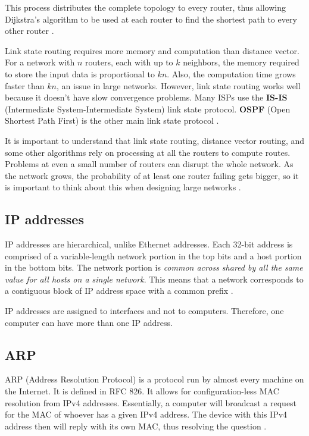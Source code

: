 \documentclass[12pt, oneside]{book}
\begin{document}
This process distributes the complete topology to every router, thus allowing Dijkstra's algorithm to be used at each router to find the shortest path to every other router \cite[p.~374]{computer-networks-tanenbaum-2012}.

Link state routing requires more memory and computation than distance vector.
For a network with \(n\) routers, each with up to \(k\) neighbors, the memory required to store the input data is proportional to \(kn\). Also, the computation time grows faster than \(kn\), an issue in large networks.
However, link state routing works well because it doesn't have slow convergence problems.
Many ISPs use the \textbf{IS-IS} (Intermediate System-Intermediate System) link state protocol.
\textbf{OSPF} (Open Shortest Path First) is the other main link state protocol \cite[p.~378]{computer-networks-tanenbaum-2012}.

It is important to understand that link state routing, distance vector routing, and some other algorithms rely on processing at all the routers to compute routes. Problems at even a small number of routers can disrupt the whole network. As the network grows, the probability of at least one router failing gets bigger, so it is important to think about this when designing large networks \cite[p.~378]{computer-networks-tanenbaum-2012}.

\subsection{IP addresses}

IP addresses are hierarchical, unlike Ethernet addresses. Each 32-bit address is comprised of a variable-length network portion in the top bits and a host portion in the bottom bits.
The network portion is \emph{common across shared by all the same value for all hosts on a single network}.
This means that a network corresponds to a contiguous block of IP address space with a common prefix \cite{computer-networks-tanenbaum-2012}.

IP addresses are assigned to interfaces and not to computers.
Therefore, one computer can have more than one IP address.

\subsection{ARP}

ARP (Address Resolution Protocol) is a protocol run by almost every machine on the Internet. It is defined in RFC
826. It allows for configuration-less MAC resolution from IPv4 addresses. Essentially, a computer will broadcast a request for the MAC of whoever has a given IPv4 address. The device with this IPv4 address then will reply with its own MAC, thus resolving the question \cite{computer-networks-tanenbaum-2012}.
\end{document}
